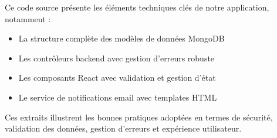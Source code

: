 Ce code source présente les éléments techniques clés de notre application, notamment :

\begin{itemize}
    \item La structure complète des modèles de données MongoDB
    \item Les contrôleurs backend avec gestion d'erreurs robuste
    \item Les composants React avec validation et gestion d'état
    \item Le service de notifications email avec templates HTML
\end{itemize}

Ces extraits illustrent les bonnes pratiques adoptées en termes de sécurité, validation des données, gestion d'erreurs et expérience utilisateur.
